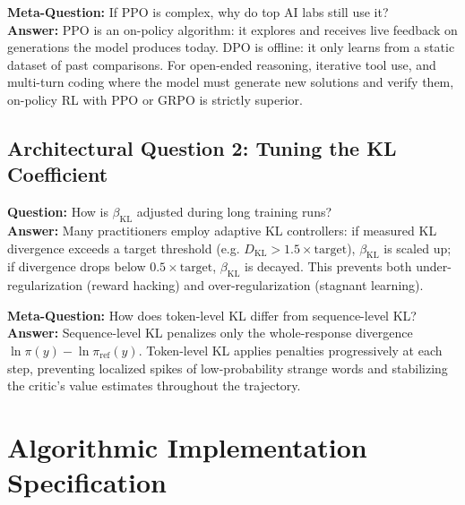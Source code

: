 \documentclass[11pt,a4paper]{article}
\theoremstyle{definition}
\begin{document}
\textbf{Meta-Question:} If PPO is complex, why do top AI labs still use it?\\
\textbf{Answer:} PPO is an on-policy algorithm: it explores and receives live feedback on generations the model produces today. DPO is offline: it only learns from a static dataset of past comparisons. For open-ended reasoning, iterative tool use, and multi-turn coding where the model must generate new solutions and verify them, on-policy RL with PPO or GRPO is strictly superior.

\subsection{Architectural Question 2: Tuning the KL Coefficient}
\textbf{Question:} How is $\beta_{\text{KL}}$ adjusted during long training runs?\\
\textbf{Answer:} Many practitioners employ adaptive KL controllers: if measured KL divergence exceeds a target threshold (e.g. $D_{\text{KL}} > 1.5 \times \text{target}$), $\beta_{\text{KL}}$ is scaled up; if divergence drops below $0.5 \times \text{target}$, $\beta_{\text{KL}}$ is decayed. This prevents both under-regularization (reward hacking) and over-regularization (stagnant learning).

\textbf{Meta-Question:} How does token-level KL differ from sequence-level KL?\\
\textbf{Answer:} Sequence-level KL penalizes only the whole-response divergence $\ln \pi(y) - \ln \pi_{\text{ref}}(y)$. Token-level KL applies penalties progressively at each step, preventing localized spikes of low-probability strange words and stabilizing the critic's value estimates throughout the trajectory.

\section{Algorithmic Implementation Specification}
\end{document}
